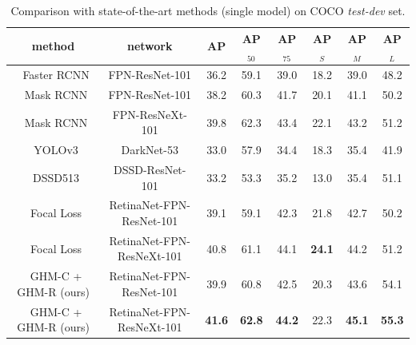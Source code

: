 \documentclass[letterpaper]{article} %
\begin{document}
\begin{table}[t]
\begin{tabular}{| c | c | c c c | c c c|}
\hline
 method & network
 & AP & AP$_{50}$ & AP$_{75}$
 & AP$_S$ & AP$_M$ &  AP$_L$\\ [.1em]
\hline
 ~Faster RCNN \cite{faster} & FPN-ResNet-101
  & 36.2 & 59.1 & 39.0 & 18.2 & 39.0 & 48.2\\
 ~Mask RCNN \cite{mask} & FPN-ResNet-101
  & 38.2 & 60.3 & 41.7 & 20.1 & 41.1 & 50.2\\
 ~Mask RCNN \cite{mask} & FPN-ResNeXt-101
  & 39.8 & 62.3 & 43.4 & 22.1 & 43.2 & 51.2\\
\hline
 ~YOLOv3 \cite{yolov3} & DarkNet-53 
  & 33.0 & 57.9 & 34.4 & 18.3 & 35.4 & 41.9 \\
 ~DSSD513 \cite{dssd} & DSSD-ResNet-101
  & 33.2 & 53.3 & 35.2 & 13.0 & 35.4 & 51.1 \\
 ~Focal Loss \cite{focal} & RetinaNet-FPN-ResNet-101
  & 39.1 & 59.1 & 42.3 & 21.8 & 42.7 & 50.2 \\
 ~Focal Loss \cite{focal} & RetinaNet-FPN-ResNeXt-101
  & 40.8 & 61.1 & 44.1 & \textbf{24.1} & 44.2 & 51.2 \\
\hline
 ~GHM-C + GHM-R (ours) & RetinaNet-FPN-ResNet-101
  & 39.9 & 60.8 & 42.5 & 20.3 & 43.6 & 54.1 \\
 ~GHM-C + GHM-R (ours) & RetinaNet-FPN-ResNeXt-101
  & \textbf{41.6} & \textbf{62.8} & \textbf{44.2} & 22.3 & \textbf{45.1} & \textbf{55.3} \\
\hline
\end{tabular}
\caption{Comparison with state-of-the-art methods (single model) on COCO \textit{test-dev} set.}
\label{tab:main}
\end{table}
\end{document}
